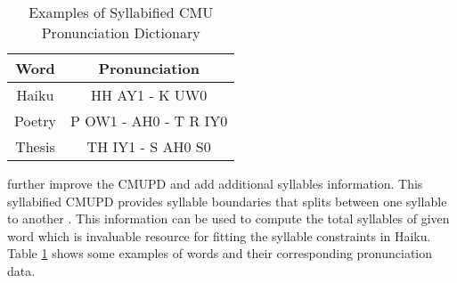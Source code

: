 \begin{table}[h]
	\centering
	
	\begin{tabular}{|c|c|}
		\hline  \textbf{Word} & \textbf{Pronunciation} \\ 
		\hline Haiku  & HH AY1 - K UW0\\
		\hline Poetry  & P OW1 - AH0 - T R IY0 \\
		\hline Thesis  &  TH IY1 - S AH0 S0 \\
		\hline
	\end{tabular} 
	
	\caption{Examples of Syllabified CMU Pronunciation Dictionary}
	\label{Sylla}
\end{table}

\citeauthor{bartlett2009syllabification} further improve the CMUPD and add additional syllables information. This syllabified CMUPD provides syllable boundaries that splits between one syllable to another \cite{bartlett2009syllabification}. This information can be used to compute the total syllables of given word which is invaluable resource for fitting the syllable constraints in Haiku. Table \ref{Sylla} shows some examples of words and their corresponding pronunciation data.

